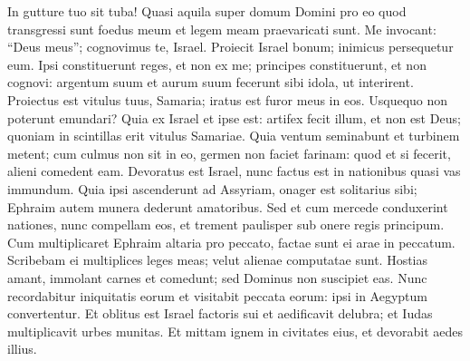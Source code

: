 \begin{biblechapter}
\begin{biblechapter}
\begin{biblechapter}
\begin{biblechapter}
\begin{biblechapter}
\begin{biblechapter}
\begin{biblechapter}
\begin{biblechapter}
 \verse In gutture tuo sit tuba!
 Quasi aquila super domum Domini
 pro eo quod transgressi sunt foedus meum
 et legem meam praevaricati sunt.
 \verse Me invocant: “Deus meus”;
 cognovimus te, Israel.
 \verse Proiecit Israel bonum;
 inimicus persequetur eum.
 \verse Ipsi constituerunt reges, et non ex me;
 principes constituerunt, et non cognovi:
 argentum suum et aurum suum
 fecerunt sibi idola,
 ut interirent.
 \verse Proiectus est vitulus tuus, Samaria;
 iratus est furor meus in eos.
 Usquequo non poterunt emundari?
 \verse Quia ex Israel et ipse est:
 artifex fecit illum,
 et non est Deus;
 quoniam in scintillas erit
 vitulus Samariae.
 \verse Quia ventum seminabunt
 et turbinem metent;
 cum culmus non sit in eo,
 germen non faciet farinam:
 quod et si fecerit,
 alieni comedent eam.
 \verse Devoratus est Israel,
 nunc factus est in nationibus
 quasi vas immundum.
 \verse Quia ipsi ascenderunt ad Assyriam, onager est solitarius sibi;
 Ephraim autem munera dederunt amatoribus.
 \verse Sed et cum mercede conduxerint nationes,
 nunc compellam eos,
 et trement paulisper sub onere regis principum.
 \verse Cum multiplicaret Ephraim altaria pro peccato,
 factae sunt ei arae in peccatum.
 \verse Scribebam ei multiplices leges meas;
 velut alienae computatae sunt.
 \verse Hostias amant,
 immolant carnes et comedunt;
 sed Dominus non suscipiet eas.
 Nunc recordabitur iniquitatis eorum
 et visitabit peccata eorum:
 ipsi in Aegyptum convertentur.
 \verse Et oblitus est Israel factoris sui
 et aedificavit delubra;
 et Iudas multiplicavit urbes munitas.
 Et mittam ignem in civitates eius,
 et devorabit aedes illius.
 

\end{biblechapter}
\end{biblechapter}
\end{biblechapter}
\end{biblechapter}
\end{biblechapter}
\end{biblechapter}
\end{biblechapter}
\end{biblechapter}
